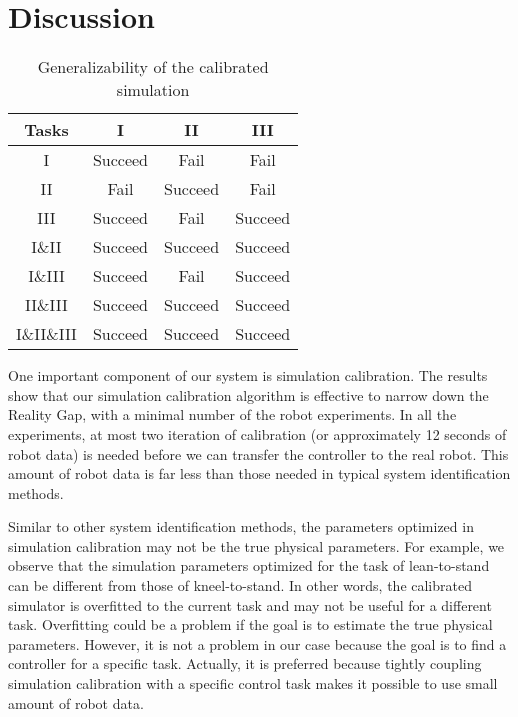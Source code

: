 \section{Discussion}
\begin{table}
\caption{Generalizability of the calibrated simulation}
 \label{table:generalize}
\begin{center}
\begin{tabular}{|c|c|c|c|}
\hline
 Tasks &  I &  II  &  III \\
 \hline
 I & Succeed & Fail & Fail  \\
 II & Fail & Succeed & Fail \\
 III & Succeed & Fail & Succeed \\
 I\&II & Succeed & Succeed & Succeed\\
 I\&III & Succeed & Fail & Succeed\\
 II\&III & Succeed & Succeed & Succeed \\
 I\&II\&III & Succeed & Succeed & Succeed\\
\hline
\end{tabular}
\end{center}
 \end{table}


One important component of our system is simulation calibration. The results show that our simulation calibration algorithm is effective to narrow down the Reality Gap, with a minimal number of the robot experiments. In all the experiments, at most two iteration of calibration (or approximately 12 seconds of robot data) is needed before we can transfer the controller to the real robot. This amount of robot data is far less than those needed in typical system identification methods.

Similar to other system identification methods, the parameters optimized in simulation calibration may not be the true physical parameters. For example, we observe that the simulation parameters optimized for the task of lean-to-stand can be different from those of kneel-to-stand. In other words, the calibrated simulator is overfitted to the current task and may not be useful for a different task. Overfitting could be a problem if the goal is to estimate the true physical parameters. However, it is not a problem in our case because the goal is to find a controller for a specific task. Actually, it is preferred because tightly coupling simulation calibration with a specific control task makes it possible to use small amount of robot data.

